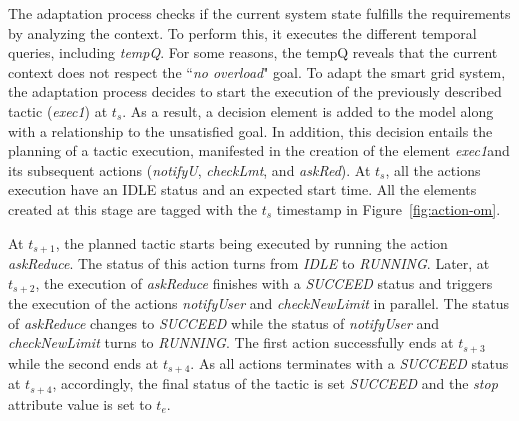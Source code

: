 %

The adaptation process checks if the current system state fulfills the requirements by analyzing the context. To perform this, it executes the different temporal queries, including \textit{tempQ}.
For some reasons, the {tempQ} reveals that the current context does not respect the ``\textit{no overload}" goal. To adapt the smart grid system, the adaptation process decides to start the execution of the previously described tactic (\textit{exec1}) at $t_s$. As a result,  
a decision element is added to the model along with a relationship to the unsatisfied goal. In addition, this decision entails the planning of a tactic execution, manifested in the creation of the element \textit{exec1}and its subsequent actions (\textit{notifyU}, \textit{checkLmt}, and \textit{askRed}). At $t_s$, all the actions execution have an IDLE status and an expected start time. All the elements created at this stage are tagged with the $t_s$ timestamp in Figure~\ref{fig:action-om}.

At $t_{s+1}$, the planned tactic starts being executed by running the action \textit{askReduce}. The status of this action turns from \textit{IDLE} to \textit{RUNNING}. Later, at $t_{s+2}$, the execution of \textit{askReduce} finishes with a \textit{SUCCEED} status and triggers the execution of the actions \textit{notifyUser} and \textit{checkNewLimit} in parallel. The status of \textit{askReduce} changes to \textit{SUCCEED} while the status of \textit{notifyUser} and \textit{checkNewLimit} turns to \textit{RUNNING}.
The first action successfully ends at $t_{s+3}$ while the second ends at $t_{s+4}$. As all actions terminates with a \textit{SUCCEED} status at $t_{s+4}$, accordingly, the final status of the tactic is set \textit{SUCCEED} and the \textit{stop} attribute value is set to $t_{e}$.  


